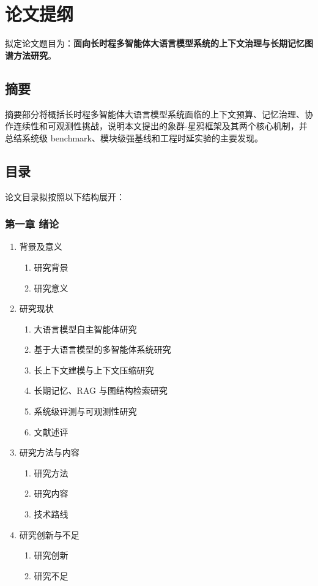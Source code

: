 \documentclass[UTF8,a4paper,zihao=-4,fontset=windows]{ctexart}
\newcommand{\reporttitle}{面向长时程多智能体大语言模型系统的上下文治理与长期记忆图谱方法研究}
\newcommand{\framework}{象群-星鸦框架}
\begin{document}
\section{论文提纲}

拟定论文题目为：\textbf{\reporttitle}。

\subsection{摘要}

摘要部分将概括长时程多智能体大语言模型系统面临的上下文预算、记忆治理、协作连续性和可观测性挑战，说明本文提出的\framework 及其两个核心机制，并总结系统级 benchmark、模块级强基线和工程时延实验的主要发现。

\subsection{目录}

论文目录拟按照以下结构展开：

\subsubsection*{第一章 绪论}
\begin{enumerate}[label=1.\arabic*]
  \item 背景及意义
  \begin{enumerate}[label=1.1.\arabic*]
    \item 研究背景
    \item 研究意义
  \end{enumerate}
  \item 研究现状
  \begin{enumerate}[label=1.2.\arabic*]
    \item 大语言模型自主智能体研究
    \item 基于大语言模型的多智能体系统研究
    \item 长上下文建模与上下文压缩研究
    \item 长期记忆、RAG 与图结构检索研究
    \item 系统级评测与可观测性研究
    \item 文献述评
  \end{enumerate}
  \item 研究方法与内容
  \begin{enumerate}[label=1.3.\arabic*]
    \item 研究方法
    \item 研究内容
    \item 技术路线
  \end{enumerate}
  \item 研究创新与不足
  \begin{enumerate}[label=1.4.\arabic*]
    \item 研究创新
    \item 研究不足
  \end{enumerate}
\end{enumerate}
\end{document}
